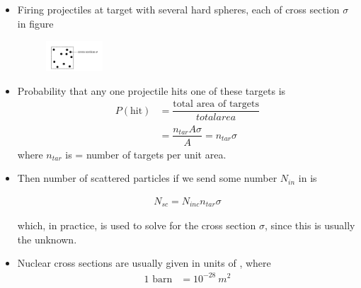 \documentclass[10pt, twocolumn]{article}
\DeclareRobustCommand{\mybox}[2][gray!20]{%
	\begin{tcolorbox}[   %
		breakable,
		left=0pt,
		right=0pt,
		top=-13pt,
		bottom=0pt,
		colback=#1,
		colframe=#1,
		width=0.45\dimexpr\textwidth\relax,
		enlarge left by=0mm,
		boxsep=1pt,
		arc=0pt,outer arc=0pt,
		]
		#2
	\end{tcolorbox}
}
\newcommand\graybox[1]{ \mybox[gray!20]{\begin{align}#1\end{align}} }
\newcommand\tlab[1]{\tag{#1}\label{#1}}
\begin{document}
\subsection{}
\begin{itemize}
	\item Firing projectiles at target with several hard spheres, each of cross section $\sigma$ in figure
	\begin{figure}[h!]
		\centering
		\includegraphics[width=0.2\textwidth]{targets.PNG}
	\end{figure}
	\item Probability that any one projectile hits one of these targets is
	\begin{align}
		P(\text{hit}) &= \dfrac{\text{total area of targets}}{total area} \\
		&= \dfrac{n_{tar} A \sigma}{A} = n_{tar} \sigma 
	\end{align}
	where $n_{tar}$ is  = number of targets per unit area. 
	
	\item Then number of scattered particles if we send some number $N_{in}$ in is
	\graybox{N_{sc} = N_{inc} n_{tar} \sigma \tlab{14.2}} 
	which, in practice, is used to solve for the cross section $\sigma$, since this is usually the unknown.
	
	\item Nuclear cross sections are usually given in units of , where
	\begin{align}
		1\text{ barn} &= 10^{-28} ~ m^2
	\end{align} 
\end{itemize}
\end{document}
